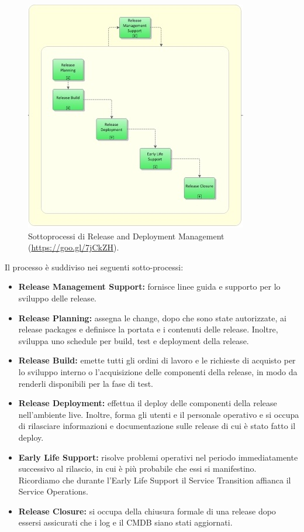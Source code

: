             \begin{figure}[H]
				\centering
				\includegraphics[scale=0.5]{immagini/rollout/release-deployment}
				\caption{Sottoprocessi di Release and Deployment Management (\url{https://goo.gl/7jCkZH}).}
			\end{figure}
         
            
            Il processo è suddiviso nei seguenti sotto-processi:
            \begin{itemize}
            	\item \textbf{Release Management Support:} fornisce linee guida e supporto per lo sviluppo delle release.
                \item \textbf{Release Planning:} assegna le change, dopo che sono state autorizzate, ai release packages e definisce la portata e i contenuti delle release. Inoltre, sviluppa uno schedule per build, test e deployment della release.
                \item \textbf{Release Build:} emette tutti gli ordini di lavoro e le richieste di acquisto per lo sviluppo interno o l'acquisizione delle componenti della release, in modo da renderli disponibili per la fase di test.
                \item \textbf{Release Deployment:} effettua il deploy delle componenti della release nell'ambiente live. Inoltre, forma gli utenti e il personale operativo e si occupa di rilasciare informazioni e documentazione sulle release di cui è stato fatto il deploy.
                \item \textbf{Early Life Support:} risolve problemi operativi nel periodo immediatamente successivo al rilascio, in cui è più probabile che essi si manifestino. Ricordiamo che durante l'Early Life Support il Service Transition affianca il Service Operations.
                \item \textbf{Release Closure:} si occupa della chiusura formale di una release dopo essersi assicurati che i log e il CMDB siano stati aggiornati.
            \end{itemize}

